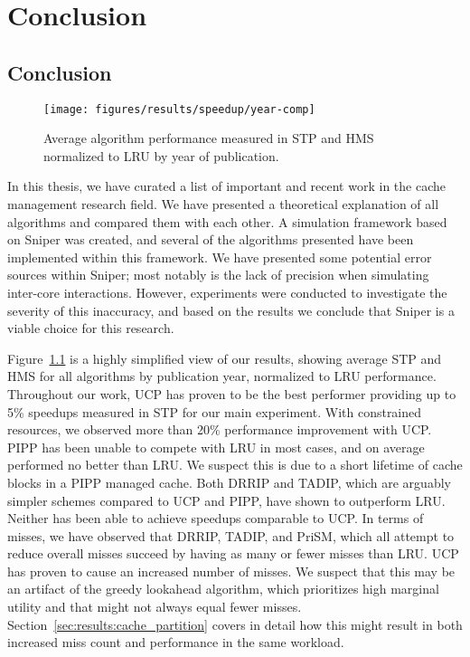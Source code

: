 
\chapter{Conclusion}
\label{cpt:conclusion}

\section{Conclusion}

\begin{figure}[ht]
    \centering
    \texttt{[image: figures/results/speedup/year-comp]}
    \caption{Average algorithm performance measured in STP and HMS normalized to LRU by year of publication.}
    \label{fig:conclusion:yearcomp}
\end{figure}

In this thesis, we have curated a list of important and recent work in the cache management research field.
We have presented a theoretical explanation of all algorithms and compared them with each other.
A simulation framework based on Sniper was created, and several of the algorithms presented have been implemented within this framework.
We have presented some potential error sources within Sniper; most notably is the lack of precision when simulating inter-core interactions.
However, experiments were conducted to investigate the severity of this inaccuracy, and based on the results we conclude that Sniper is a viable choice for this research.

Figure~\ref{fig:conclusion:yearcomp} is a highly simplified view of our results, showing average STP and HMS for all algorithms by publication year, normalized to LRU performance.
Throughout our work, UCP has proven to be the best performer providing up to 5\% speedups measured in STP for our main experiment.
With constrained resources, we observed more than 20\% performance improvement with UCP.
PIPP has been unable to compete with LRU in most cases, and on average performed no better than LRU.
We suspect this is due to a short lifetime of cache blocks in a PIPP managed cache.
Both DRRIP and TADIP, which are arguably simpler schemes compared to UCP and PIPP, have shown to outperform LRU.
Neither has been able to achieve speedups comparable to UCP.
In terms of misses, we have observed that DRRIP, TADIP, and PriSM, which all attempt to reduce overall misses succeed by having as many or fewer misses than LRU.
UCP has proven to cause an increased number of misses.
We suspect that this may be an artifact of the greedy lookahead algorithm, which prioritizes high marginal utility and that might not always equal fewer misses.
Section~\ref{sec:results:cache_partition} covers in detail how this might result in both increased miss count and performance in the same workload.


